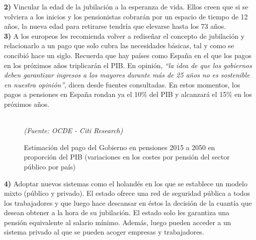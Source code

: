 \vspace{-0.3cm}
\noindent \textbf{2)} Vincular la edad de la jubilaci\'on a la esperanza de vida. Ellos creen que si se volviera a los inicios y los pensionistas cobrar\'an por un espacio de tiempo de 12 a\~nos, la nueva edad para retirarse tendr\'ia que elevarse hasta los 73 a\~nos.\\

\vspace{-0.3cm}
\noindent \textbf{3)} A los europeos les recomienda volver a redise\~nar el concepto de jubilaci\'on y relacionarlo a un pago que solo cubra las necesidades b\'asicas, tal y como se concibi\'o hace un siglo. Recuerda que hay pa\'ises como Espa\~na en el que los pagos en los pr\'oximos a\~nos triplicar\'an el PIB.  En opini\'on, \textit{``la idea de que los gobiernos deben garantizar ingresos a los mayores durante m\'as de 25 a\~nos no es sostenible en nuestra opini\'on''}, dicen desde fuentes consultadas.  En estos momentos, los pagos a pensiones en Espa\~na rondan ya el 10\% del PIB y alcanzar\'a el 15\% en los pr\'oximos a\~nos.

\begin{figure}[!ht]
\centering
{}
\caption[Estimaci\'on del pago del Gobierno en pensiones 2015 a 2050 en proporci\'on del PIB]{Estimaci\'on del pago del Gobierno en pensiones 2015 a 2050 en proporci\'on del PIB (variaciones en los costes por pensi\'on del sector p\'ublico por pa\'is)}\\
\textit{\small{(Fuente: OCDE - Citi Research)}}
\end{figure}

\noindent \textbf{4)} Adoptar nuevos sistemas como el holand\'es en los que se establece  un modelo mixto (p\'ublico y privado). El estado ofrece una red de seguridad p\'ublica a todos los trabajadores y que luego hace descansar en \'estos la decisi\'on de la cuant\'ia que desean obtener a la hora de su jubilaci\'on. El estado solo les garantiza una pensi\'on equivalente al salario m\'inimo. Adem\'as, luego pueden acceder a un sistema privado al que se pueden acoger empresas y trabajadores.\\

